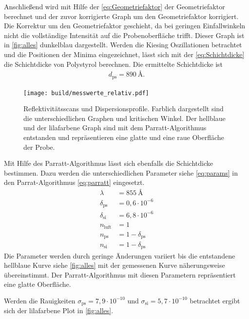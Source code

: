 Anschließend wird mit Hilfe der \autoref{eq:Geometriefaktor} der Geometriefaktor berechnet und der zuvor korrigierte Graph um den Geometriefaktor korrigiert. 
Die Korrektur um den Geometriefaktor geschieht, da bei geringen Einfallwinkeln nicht die vollständige Intensität auf die Probenoberfläche trifft. 
Dieser Graph ist in \autoref{fig:alles} dunkelblau dargestellt. 
Werden die Kiesing Oszillationen betrachtet und die Positionen der Minima eingezeichnet, lässt sich mit der \autoref{eq:Schichtdicke} die 
Schichtdicke von Polystyrol berechnen.
Die ermittelte Schichtdicke ist
\begin{align*}
    d_\text{ps} = \SI{890}{\angstrom}.
\end{align*}
\begin{figure}
    \centering
    \texttt{[image: build/messwerte\_relativ.pdf]}
    \caption{Reflektivitätsscans und Dispersionsprofile. Farblich dargestellt sind die unterschiedlichen Graphen und kritischen Winkel.
            Der hellblaue und der lilafarbene Graph sind mit dem Parratt-Algorithmus entstanden und repräsentieren eine glatte und eine raue Oberfläche der Probe. }
    \label{fig:alles}
\end{figure}
\FloatBarrier
Mit Hilfe des Parratt-Algorithmus lässt sich ebenfalls die Schichtdicke bestimmen. 
Dazu werden die unterschiedlichen Parameter siehe \autoref{eq:params} in den Parrat-Algorithmus \autoref{eq:parratt} eingesetzt.
\begin{equation}\label{eq:params}    
    \begin{split}
        \lambda &= \SI{855}{\angstrom}\\
        \delta_\text{ps} &= 0,6\cdot 10^{-6}\\
        \delta_\text{si}&= 6,8\cdot 10^{-6} \\
        n_\text{luft} &= 1 \\
        n_\text{ps} &= 1 - \delta_\text{ps} \\
        n_\text{si} &= 1 - \delta_\text{ps} 
    \end{split}
\end{equation}
Die Parameter werden durch geringe Änderungen variiert bis die entstandene hellblaue Kurve siehe \autoref{fig:alles} mit der gemessenen
Kurve näherungsweise übereinstimmt. 
Der Parratt-Algorithmus mit diesen Parametern repräsentiert eine glatte Oberfläche.

Werden die Rauigkeiten $\sigma_\text{ps} = 7,9\cdot 10^{-10}$ und $\sigma_\text{si} = 5,7\cdot 10^{-10}$
betrachtet ergibt sich der lilafarbene Plot in \autoref{fig:alles}.

